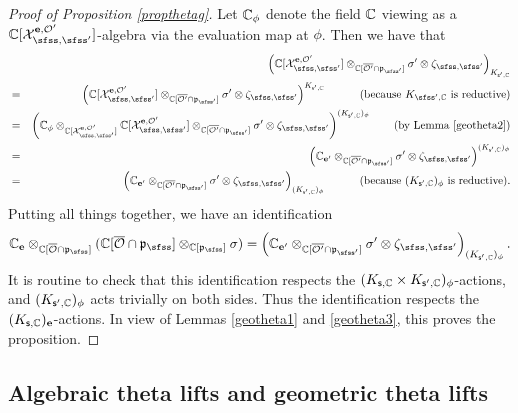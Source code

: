 \documentclass[11pt,a4paper]{amsart}
\newcommand{\CO}{{\mathcal {O}}}
\newcommand{\CX}{{\mathcal {X}}}
\newcommand{\p}{\mathfrak p}
\numberwithin{equation}{section}
\theoremstyle{remark}
\begin{document}
\begin{proof}[Proof of Proposition \ref{propthetag}]
 Let $\mathbb{C}_\phi$ denote the field $\mathbb{C}$ viewing as a $\C[\CX_{\sfss, \sfss'}^{\mathbf e, \CO'}]$-algebra via the evaluation map at $\phi$. Then we have that
\begin{eqnarray*}
      &&\left( \C[\CX_{\sfss, \sfss'}^{\mathbf e, \CO'}] \otimes_{\C[\overline{\CO'}\cap \p_{\sfss'}]}\sigma'\otimes \zeta_{\sfss, \sfss'}\right)_{K_{\mathsf s', \C}}\\
             &=&\left( \C[\CX_{\sfss, \sfss'}^{\mathbf e, \CO'}] \otimes_{\C[\overline{\CO'}\cap \p_{\sfss'}]}\sigma'\otimes \zeta_{\sfss, \sfss'}\right)^{K_{\mathsf s', \C}}\quad \qquad (\textrm{because $K_{\sfss',\C}$ is reductive})\\
             &=&\left( \C_\phi\otimes_{\C[\CX_{\sfss, \sfss'}^{\mathbf e, \CO'}]} \C[\CX_{\sfss, \sfss'}^{\mathbf e, \CO'}] \otimes_{\C[\overline{\CO'}\cap \p_{\sfss'}]}\sigma'\otimes \zeta_{\sfss, \sfss'}\right)^{ (K_{\mathsf s',\C})_\phi} \qquad (\textrm{by Lemma \ref{geotheta2}})\\
               &=&\left( \C_{\mathbf e'}  \otimes_{\C[\overline{\CO'}\cap \p_{\sfss'}]}\sigma'\otimes \zeta_{\sfss, \sfss'}\right)^{ (K_{\mathsf s',\C})_\phi}\\
                 &=&\left( \C_{\mathbf e'}  \otimes_{\C[\overline{\CO'}\cap \p_{\sfss'}]}\sigma'\otimes \zeta_{\sfss, \sfss'}\right)_{ (K_{\mathsf s',\C})_\phi} \quad \qquad (\textrm{because $ (K_{\mathsf s',\C})_\phi$ is reductive}).
\end{eqnarray*}
Putting all things together, we have an identification
\[
\C_\mathbf e \otimes_{\C[\overline \CO\cap \p_{\sfss}]} (\C[\overline \CO\cap \p_{\sfss}]\otimes_{\C[\p_{\sfss}]} \sigma)=\left( \C_{\mathbf e'}  \otimes_{\C[\overline{\CO'}\cap \p_{\sfss'}]}\sigma'\otimes \zeta_{\sfss, \sfss'}\right)_{ (K_{\mathsf s',\C})_\phi}.
\]
It is routine to check that this identification respects the $(K_{\mathsf s,\mathbb{C}}\times K_{\mathsf s', \mathbb{C}})_\phi$-actions, and $ (K_{\mathsf s',\mathbb{C}})_\phi$ acts trivially on both sides. Thus the identification respects the $(K_{\mathsf s,\mathbb{C}})_{\mathbf e}$-actions. In view of Lemmas \ref{geotheta1} and \ref{geotheta3}, this proves the proposition.
\end{proof}


\subsection{Algebraic theta lifts and  geometric theta lifts}
\end{document}
